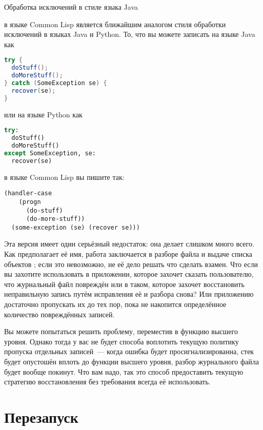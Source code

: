  Обработка исключений в стиле языка Java 

 в языке Common Lisp является ближайшим аналогом стиля обработки
исключений в языках Java и Python. То, что вы можете записать на языке Java как 

\begin{lstlisting}[language=Java]
try {
  doStuff();
  doMoreStuff();
} catch (SomeException se) {
  recover(se);
}
\end{lstlisting} 

или на языке Python как 

\begin{lstlisting}[language=Python]
try:
  doStuff()
  doMoreStuff()
except SomeException, se:
  recover(se)
\end{lstlisting} 

в языке Common Lisp вы пишите так: 

\begin{lstlisting}
(handler-case
    (progn
      (do-stuff)
      (do-more-stuff))
  (some-exception (se) (recover se)))
\end{lstlisting} 


Эта версия  имеет один серьёзный недостаток: она делает слишком много
всего. Как предполагает её имя, работа  заключается в разборе файла и
выдаче списка объектов ; если это невозможно, не её дело решать что
сделать взамен. Что если вы захотите использовать  в приложении,
которое захочет сказать пользователю, что журнальный файл повреждён или в таком, которое
захочет восстановить неправильную запись путём исправления её и разбора снова? Или
приложению достаточно пропускать их до тех пор, пока не накопится определённое количество
повреждённых записей.

Вы можете попытаться решить проблему, переместив  в функцию высшего
уровня. Однако тогда у вас не будет способа воплотить текущую политику пропуска отдельных
записей~--- когда ошибка будет просигнализированна, стек будет опустошён вплоть до функции
высшего уровня, разбор журнального файла будет вообще покинут. Что вам надо, так это
способ предоставить текущую стратегию восстановления без требования всегда её
использовать.

\section{Перезапуск}

